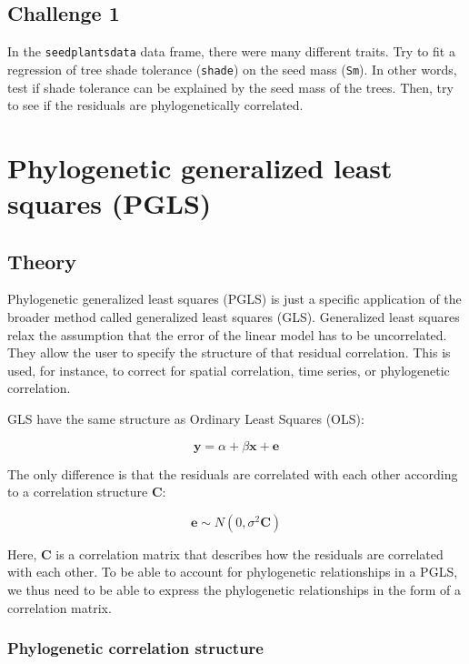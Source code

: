 \documentclass[
]{book}
\begin{document}
\hypertarget{challenge-1}{%
\section{Challenge 1}\label{challenge-1}}

In the \texttt{seedplantsdata} data frame, there were many different traits. Try to fit a regression of tree shade tolerance (\texttt{shade}) on the seed mass (\texttt{Sm}). In other words, test if shade tolerance can be explained by the seed mass of the trees. Then, try to see if the residuals are phylogenetically correlated.

\hypertarget{pgls}{%
\chapter{Phylogenetic generalized least squares (PGLS)}\label{pgls}}

\hypertarget{theory-1}{%
\section{Theory}\label{theory-1}}

Phylogenetic generalized least squares (PGLS) is just a specific application of the broader method called generalized least squares (GLS). Generalized least squares relax the assumption that the error of the linear model has to be uncorrelated. They allow the user to specify the structure of that residual correlation. This is used, for instance, to correct for spatial correlation, time series, or phylogenetic correlation.

GLS have the same structure as Ordinary Least Squares (OLS):

\[\textbf{y} = \alpha + \beta \textbf{x} + \textbf{e}\]

The only difference is that the residuals are correlated with each other according to a correlation structure \(\textbf{C}\):

\[\textbf{e} \sim N(0,\sigma^2\textbf{C})\]

Here, \(\textbf{C}\) is a correlation matrix that describes how the residuals are correlated with each other. To be able to account for phylogenetic relationships in a PGLS, we thus need to be able to express the phylogenetic relationships in the form of a correlation matrix.

\hypertarget{phylogenetic-correlation-structure}{%
\subsection{Phylogenetic correlation structure}\label{phylogenetic-correlation-structure}}
\end{document}
